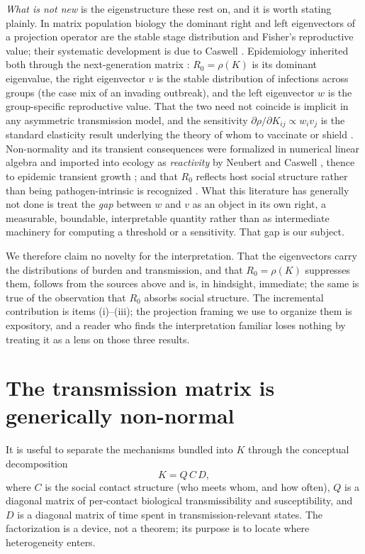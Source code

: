 \documentclass[12pt]{article}
\begin{document}
\emph{What is not new} is the eigenstructure these rest on, and it is worth stating plainly. In matrix population biology the dominant right and left eigenvectors of a projection operator are the stable stage distribution and Fisher's reproductive value; their systematic development is due to Caswell \cite{caswell2001}. Epidemiology inherited both through the next-generation matrix \cite{diekmann2010,vandendriessche2002}: $R_0=\rho(K)$ is its dominant eigenvalue, the right eigenvector $v$ is the stable distribution of infections across groups (the case mix of an invading outbreak), and the left eigenvector $w$ is the group-specific reproductive value. That the two need not coincide is implicit in any asymmetric transmission model, and the sensitivity $\partial\rho/\partial K_{ij}\propto w_i v_j$ is the standard elasticity result underlying the theory of whom to vaccinate or shield \cite{caswell2001}. Non-normality and its transient consequences were formalized in numerical linear algebra \cite{trefethen2005} and imported into ecology as \emph{reactivity} by Neubert and Caswell \cite{neubert1997}, thence to epidemic transient growth \cite{hosack2008}; and that $R_0$ reflects host social structure rather than being pathogen-intrinsic is recognized \cite{delamater2019}. What this literature has generally not done is treat the \emph{gap} between $w$ and $v$ as an object in its own right, a measurable, boundable, interpretable quantity rather than as intermediate machinery for computing a threshold or a sensitivity. That gap is our subject.

We therefore claim no novelty for the interpretation. That the eigenvectors carry the distributions of burden and transmission, and that $R_0=\rho(K)$ suppresses them, follows from the sources above and is, in hindsight, immediate; the same is true of the observation that $R_0$ absorbs social structure. The incremental contribution is items (i)--(iii); the projection framing we use to organize them is expository, and a reader who finds the interpretation familiar loses nothing by treating it as a lens on those three results.

\section{The transmission matrix is generically non-normal}\label{sec:nonnormal}

It is useful to separate the mechanisms bundled into $K$ through the conceptual decomposition
\begin{equation}
K=Q\,C\,D,
\end{equation}
where $C$ is the social contact structure (who meets whom, and how often), $Q$ is a diagonal matrix of per-contact biological transmissibility and susceptibility, and $D$ is a diagonal matrix of time spent in transmission-relevant states. The
factorization is a device, not a theorem; its purpose is to locate where heterogeneity enters.
\end{document}
